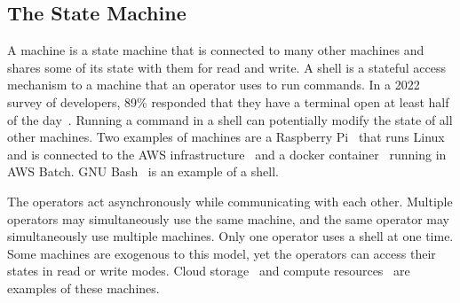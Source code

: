 \subsection{The State Machine}

A machine is a state machine that is connected to many other machines and shares some of its state with them for read and write. A shell is a stateful access mechanism to a machine that an operator uses to run commands. In a 2022 survey of developers, 89\% responded that they have a terminal open at least half of the day~\cite{textualize_founded}. Running a command in a shell can potentially modify the state of all other machines. Two examples of machines are a Raspberry Pi~\cite{rpi} that runs Linux and is connected to the AWS infrastructure~\cite{aws} and a docker container~\cite{docker} running in AWS Batch. GNU Bash~\cite{gnu_bash} is an example of a shell.

The operators act asynchronously while communicating with each other. Multiple operators may simultaneously use the same machine, and the same operator may simultaneously use multiple machines. Only one operator uses a shell at one time. Some machines are exogenous to this model, yet the operators can access their states in read or write modes. Cloud storage~\cite{aws_s3} and compute resources~\cite{aws_batch} are examples of these machines.